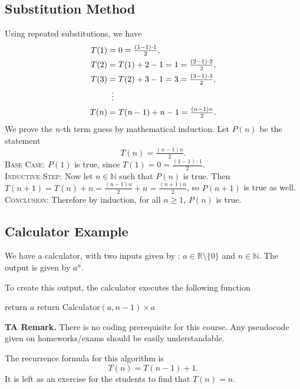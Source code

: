 \documentclass{article}
\begin{document}
\subsection*{Substitution Method}
    Using repeated substitutions, we have
    \begin{align*}
        T(1) &= 0 = \tfrac{(1 - 1) \cdot 1}{2}, \\
        T(2) &= T(1) + 2 - 1 = 1 = \tfrac{(2 - 1) \cdot 2}{2}, \\
        T(3) &= T(2) + 3 - 1 = 3 = \tfrac{(3 - 1) \cdot 3}{2}, \\
        &\vdotswithin{ = } \\
        T(n) &= T(n - 1) + n - 1 = \tfrac{(n - 1)n}{2}.
    \end{align*}
    We prove the $n$-th term guess by mathematical induction. Let $P(n)$ be the statement $$T(n) = \tfrac{(n - 1)n}{2}.$$
    \textsc{Base Case}: $P(1)$ is true, since $T(1) = 0 = \tfrac{(1 - 1) \cdot 1}{2}$. \\
    \textsc{Inductive Step}: Now let $n \in \mathbb{N}$ such that $P(n)$ is true. Then $T(n + 1) = T(n) + n = \tfrac{(n - 1)n}{2} + n = \tfrac{(n + 1)n}{2}$, so $P(n + 1)$ is true as well. \\
    \textsc{Conclusion}: Therefore by induction, for all $n \ge 1$, $P(n)$ is true.
    
\subsection*{Calculator Example}
    We have a calculator, with two inputs given by : $a \in \mathbb{R} \setminus \{0\}$ and $n \in \mathbb{N}$. The output is given by $a^{n}$.
    
    To create this output, the calculator executes the following function
    \begin{algorithm}
    \caption{Calculator($a$, $n$)}\label{alg:Calc1}
    \begin{algorithmic}
            \State return $a$
            \State return Calculator$(a, n - 1) \times a$
        \EndIf
    \end{algorithmic}
    \end{algorithm}

    \vspace{1.5mm}
    \textbf{TA Remark.} There is no coding prerequisite for this course. Any pseudocode given on homeworks/exams should be easily understandable.
    
    \vspace{1.5mm}
    The recurrence formula for this algorithm is $$T(n) = T(n - 1) + 1.$$ It is left as an exercise for the students to find that $T(n) = n$.
    
\end{document}

